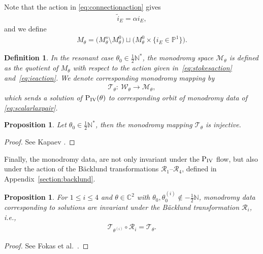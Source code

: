 \documentclass[pdftex]{sigma}
\numberwithin{equation}{section}
\newtheorem{pro}[thm]{Proposition}
\newtheorem*{def*}{Definition}
\begin{document}
Note that the action in \eqref{eq:connectionaction} gives
\begin{gather}
\widetilde{i}_E=\alpha i_E,\label{eq:ieaction}
\end{gather}
and we def\/ine
\begin{gather*}
M_\theta=\big(M_\theta^s\setminus M_\theta^0\big)\sqcup \big(M_\theta^0\times \big\{i_E\in \mathbb{P}^1\big\}\big).
\end{gather*}
\begin{def*}
In the resonant case $\theta_0\in \tfrac{1}{2}\mathbb{N}^*$, the monodromy space $\mathcal{M}_\theta$ is def\/ined as the quotient of $M_\theta$ with respect to the action given in~\eqref{eq:stokesaction} and~\eqref{eq:ieaction}. We denote corresponding monodromy mapping by
	\begin{gather*}
	\mathcal{T}_\theta\colon \ \mathcal{W}_\theta\rightarrow \mathcal{M}_\theta,
	\end{gather*}
	which sends a solution of ${\rm P}_{\rm IV}(\theta)$ to corresponding orbit of monodromy data of \eqref{eq:scalarlaxpair}.
\end{def*}
\begin{pro}\label{pro:injectiveresonant}
	Let $\theta_0\in \tfrac{1}{2}\mathbb{N}^*$, then the monodromy mapping $\mathcal{T}_\theta$ is injective.
\end{pro}
\begin{proof}
	See Kapaev \cite{kapaev1998}.
\end{proof}

Finally, the monodromy data, are not only invariant under the ${\rm P}_{\rm IV}$ f\/low, but also under the action of the B\"acklund transformations $\mathcal{R}_1$--$\mathcal{R}_4$, def\/ined in Appendix~\ref{section:backlund}.
\begin{pro}\label{pro:schlesinger}
	For $1\leq i\leq 4$ and $\theta\in\mathbb{C}^2$ with $\theta_0,\theta_0^{(i)}\notin -\tfrac{1}{2}\mathbb{N}$, monodromy data correspon\-ding to solutions are invariant under the B\"acklund transformation $\mathcal{R}_i$, i.e.,
	\begin{gather*}
	\mathcal{T}_{\theta^{(i)}}\circ \mathcal{R}_i=\mathcal{T}_\theta.
	\end{gather*}
	\end{pro}
	\begin{proof}
	See Fokas et al.~\cite{fokasmugan1988}.
	\end{proof}
\end{document}
